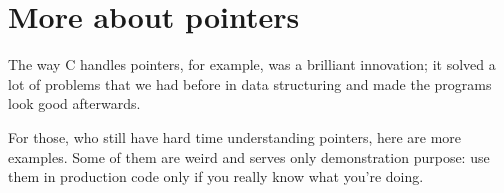 \section{More about pointers}
\myindex{\CLanguageElements!\Pointers}
\label{label_pointers}

\epigraph{The way C handles pointers, for example, was a brilliant innovation;
it solved a lot of problems that we had before in data structuring and
made the programs look good afterwards.}
{}

For those, who still have hard time understanding \CCpp pointers, here are more examples.
Some of them are weird and serves only demonstration purpose:
use them in production code only if you really know what you're doing.







